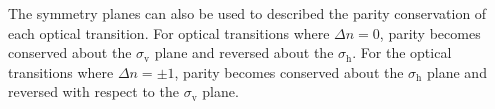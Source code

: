 The symmetry planes can also be used to described the parity conservation of each optical transition. For optical transitions where $\Delta n = 0$, parity becomes conserved about the $\sigma_\text{v}$ plane and reversed about the  $\sigma_\text{h}$. For the optical transitions where $\Delta n = \pm 1$, parity becomes conserved about the $\sigma_\text{h}$ plane and reversed with respect to the $\sigma_\text{v}$ plane.








